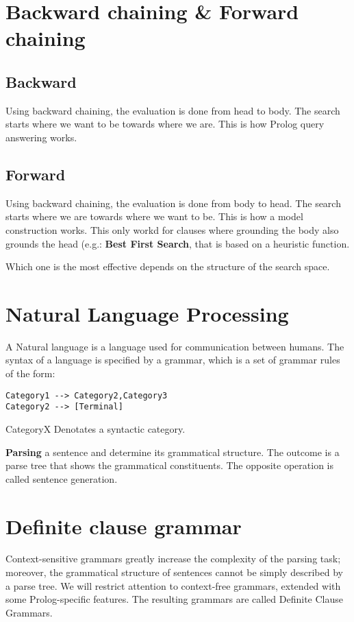 \documentclass[12pt, oneside]{report}
\numberwithin{definition}{chapter}
\numberwithin{theorem}{chapter}
\numberwithin{lemma}{chapter}
\numberwithin{Rule}{chapter}
\numberwithin{equation}{chapter}
\begin{document}
\section{Backward chaining \& Forward chaining}
\subsection{Backward}
Using backward chaining, the evaluation is done from head to body. The search starts where we want to be towards where we are. This is how Prolog query answering works.
\subsection{Forward}
Using backward chaining, the evaluation is done from body to head. The search starts where we are towards where we want to be. This is how a model construction works. This only workd for clauses where grounding the body also grounds the head (e.g.: \textbf{Best First Search}, that is based on a heuristic function.

Which one is the most effective depends on the structure of the search space.

\section{Natural Language Processing}
A Natural language is a language used for communication between humans. The syntax of a language is specified by a grammar, which is a set of grammar rules of the form:
\begin{verbatim}
Category1 --> Category2,Category3
Category2 --> [Terminal]
\end{verbatim}
CategoryX Denotates a syntactic category.

\textbf{Parsing} a sentence and determine its grammatical structure. The outcome is a parse tree that shows the grammatical constituents. The opposite operation is called sentence generation.

\section{Definite clause grammar}
Context-sensitive grammars greatly increase the complexity of the parsing task; moreover, the grammatical structure of sentences cannot be simply described by a parse tree. We will restrict attention to context-free grammars, extended with some Prolog-specific features. The resulting grammars are called Definite Clause Grammars.
\end{document}
